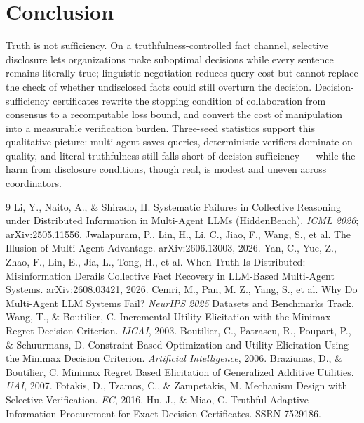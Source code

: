 \documentclass[letterpaper]{article}
\begin{document}
\section{Conclusion}
Truth is not sufficiency. On a truthfulness-controlled fact channel, selective disclosure lets organizations make suboptimal decisions while every sentence remains literally true; linguistic negotiation reduces query cost but cannot replace the check of whether undisclosed facts could still overturn the decision. Decision-sufficiency certificates rewrite the stopping condition of collaboration from consensus to a recomputable loss bound, and convert the cost of manipulation into a measurable verification burden. Three-seed statistics support this qualitative picture: multi-agent saves queries, deterministic verifiers dominate on quality, and literal truthfulness still falls short of decision sufficiency --- while the harm from disclosure conditions, though real, is modest and uneven across coordinators.


\begin{thebibliography}{9}
 Li, Y., Naito, A., \& Shirado, H. Systematic Failures in Collective Reasoning under Distributed Information in Multi-Agent LLMs (HiddenBench). \emph{ICML 2026}; arXiv:2505.11556.
 Jwalapuram, P., Lin, H., Li, C., Jiao, F., Wang, S., et al. The Illusion of Multi-Agent Advantage. arXiv:2606.13003, 2026.
 Yan, C., Yue, Z., Zhao, F., Lin, E., Jia, L., Tong, H., et al. When Truth Is Distributed: Misinformation Derails Collective Fact Recovery in LLM-Based Multi-Agent Systems. arXiv:2608.03421, 2026.
 Cemri, M., Pan, M. Z., Yang, S., et al. Why Do Multi-Agent LLM Systems Fail? \emph{NeurIPS 2025} Datasets and Benchmarks Track.
 Wang, T., \& Boutilier, C. Incremental Utility Elicitation with the Minimax Regret Decision Criterion. \emph{IJCAI}, 2003.
 Boutilier, C., Patrascu, R., Poupart, P., \& Schuurmans, D. Constraint-Based Optimization and Utility Elicitation Using the Minimax Decision Criterion. \emph{Artificial Intelligence}, 2006.
 Braziunas, D., \& Boutilier, C. Minimax Regret Based Elicitation of Generalized Additive Utilities. \emph{UAI}, 2007.
 Fotakis, D., Tzamos, C., \& Zampetakis, M. Mechanism Design with Selective Verification. \emph{EC}, 2016.
 Hu, J., \& Miao, C. Truthful Adaptive Information Procurement for Exact Decision Certificates. SSRN 7529186.
\end{thebibliography}
\end{document}
